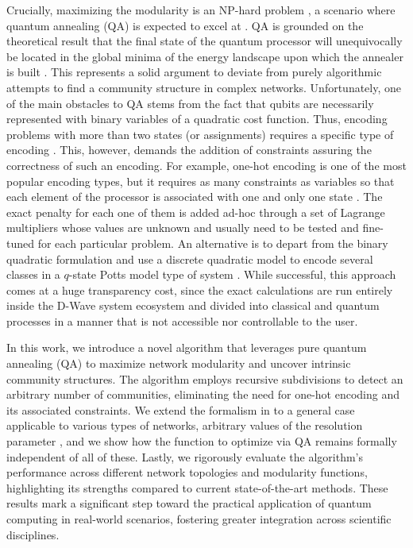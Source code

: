 \documentclass[pdflatex,sn-mathphys-num]{sn-jnl}%
\begin{document}
Crucially, maximizing the modularity is an NP-hard problem \cite{Brandes2008}, a scenario where quantum annealing (QA) is expected to excel at \cite{Farhi2001}. QA is grounded on the theoretical result that the final state of the quantum processor will unequivocally be located in the global minima of the energy landscape upon which the annealer is built \citep{Johnson2011,Rajak2022}. This represents a solid argument to deviate from purely algorithmic attempts to find a community structure in complex networks. Unfortunately, one of the main obstacles to QA stems from the fact that qubits are necessarily represented with binary variables of a quadratic cost function. Thus, encoding problems with more than two states (or assignments) requires a specific type of encoding \cite{glover_quantum_2022,chancellor_domain_2019}. This, however, demands the addition of constraints assuring the correctness of such an encoding. For example, one-hot encoding is one of the most popular encoding types, but it requires as many constraints as variables so that each element of the processor is associated with one and only one state \citep{Ushijima-Mwesigwa2017,Negre2020}. The exact penalty for each one of them is added ad-hoc through a set of Lagrange multipliers whose values are unknown and usually need to be tested and fine-tuned for each particular problem. An alternative is to depart from the binary quadratic formulation and use a discrete quadratic model to encode several classes in a $q$-state Potts model type of system \citep{Wierzbinski2023}. While successful, this approach comes at a huge transparency cost, since the exact calculations are run entirely inside the D-Wave system ecosystem and divided into classical and quantum processes in a manner that is not accessible nor controllable to the user. 

In this work, we introduce a novel algorithm that leverages pure quantum annealing (QA) to maximize network modularity and uncover intrinsic community structures. The algorithm employs recursive subdivisions to detect an arbitrary number of communities, eliminating the need for one-hot encoding and its associated constraints. We extend the formalism in \cite{Newman2006} to a general case applicable to various types of networks, arbitrary values of the resolution parameter \cite{Reichardt2006}, and we show how the function to optimize via QA remains formally independent of all of these. Lastly, we rigorously evaluate the algorithm’s performance across different network topologies and modularity functions, highlighting its strengths compared to current state-of-the-art methods. These results mark a significant step toward the practical application of quantum computing in real-world scenarios, fostering greater integration across scientific disciplines.
\end{document}
